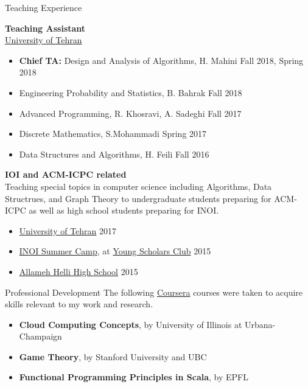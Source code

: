 \documentclass{resume} %
\begin{document}
\begin{rSection}{Teaching Experience}
	
	{\bf Teaching Assistant}
	\\\href{http://ut.ac.ir/en}{University of Tehran}
	\begin{itemize}
		\item {\bf Chief TA:} Design and Analysis of Algorithms, H. Mahini \hfill Fall 2018, Spring 2018
		\item Engineering Probability and Statistics, B. Bahrak \hfill Fall 2018
		\item Advanced Programming, R. Khosravi, A. Sadeghi \hfill Fall 2017
		\item Discrete Mathematics, S.Mohammadi \hfill Spring 2017
		\item Data Structures and Algorithms, H. Feili \hfill Fall 2016
	\end{itemize}
	
	{\bf IOI and ACM-ICPC related}
	\\Teaching special topics in computer science including Algorithms, Data Structrues,
	and Graph Theory to undergraduate students preparing for ACM-ICPC as well as high school
	students preparing for INOI.
	\begin{itemize}
		\item \href{http://ut.ac.ir/en}{University of Tehran} \hfill 2017
		\item \href{http://inoi.ir/}{INOI Summer Camp}, at \href{http://ysc.ac.ir/}{Young Scholars Club} \hfill 2015
		\item \href{http://www.helli.ir/}{Allameh Helli High School} \hfill 2015
	\end{itemize}
	
\end{rSection}


\begin{rSection}{Professional Development}
	The following \href{https://www.coursera.org/}{Coursera} courses were taken to acquire skills relevant to my work and research.
	\begin{itemize}
		\item {\bf Cloud Computing Concepts}, by University of Illinois at Urbana-Champaign
		\item {\bf Game Theory}, by Stanford University and UBC
		\item {\bf Functional Programming Principles in Scala}, by EPFL
	\end{itemize}
\end{rSection}
\end{document}
